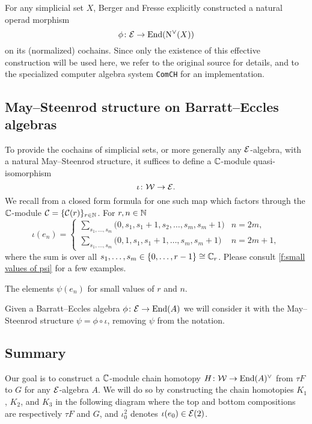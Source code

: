 For any simplicial set $X$, Berger and Fresse explicitly constructed a natural operad morphism
\[
\phi \colon \mathcal{E} \to \mathrm{End}(\operatorname{N^{\vee}}(X))
\]
on its (normalized) cochains.
Since only the existence of this effective construction will be used here, we refer to the original source for details, and to the specialized computer algebra system \texttt{ComCH} for an implementation.

\subsection{May--Steenrod structure on Barratt--Eccles algebras}

To provide the cochains of simplicial sets, or more generally any $\mathcal{E}$-algebra, with a natural May--Steenrod structure, it suffices to define a $\mathbb{C}$-module quasi-isomorphism
\[
\iota \colon \mathcal{W} \to \mathcal{E}.
\]
We recall from \cite{medina2021may_st} a closed form formula for one such map which factors through the $\mathbb{C}$-module $\mathcal{C} = \{\mathcal{C}(r)\}_{r\in\mathbb{N}}$.
For $r,n\in\mathbb{N}$
\begin{equation*}
	\iota(e_{n}) =
	\begin{cases}
		\displaystyle{\sum_{s_1, \dots, s_m}} \big(0, {s_1}, {s_1+1}, {s_2}, \dots, {s_{m}}, {s_{m}+1} \big) & n = 2m, \\
		\displaystyle{\sum_{s_1, \dots, s_m}} \big(0, 1, {s_1}, {s_1+1}, \dots, {s_{m}}, {s_{m}+1} \big) & n = 2m+1,
	\end{cases}
\end{equation*}
where the sum is over all $s_1, \dots, s_m \in \{0, \dots, r-1\} \cong \mathbb{C}_r$.
Please consult \cref{f:small values of psi} for a few examples.

\begin{table}
	\centering
	
	\caption{The elements $\psi(e_n)$ for small values of $r$ and $n$.}
	\label{f:small values of psi}
\end{table}

Given a Barratt--Eccles algebra $\phi \colon \mathcal{E} \to \mathrm{End}(A)$ we will consider it with the May--Steenrod structure $\psi = \phi \circ \iota$, removing $\psi$ from the notation.

\subsection{Summary}

Our goal is to construct a $\mathbb{C}$-module chain homotopy $H \colon \mathcal{W} \to \mathrm{End}(A)^\vee$ from $\tau F$ to $G$ for any $\mathcal{E}$-algebra $A$.
We will do so by constructing the chain homotopies $K_1$, $K_2$, and $K_3$ in the following diagram where the top and bottom compositions are respectively $\tau F$ and $G$, and $\iota_0^2$ denotes $\iota(e_0) \in \mathcal{E}(2)$.

